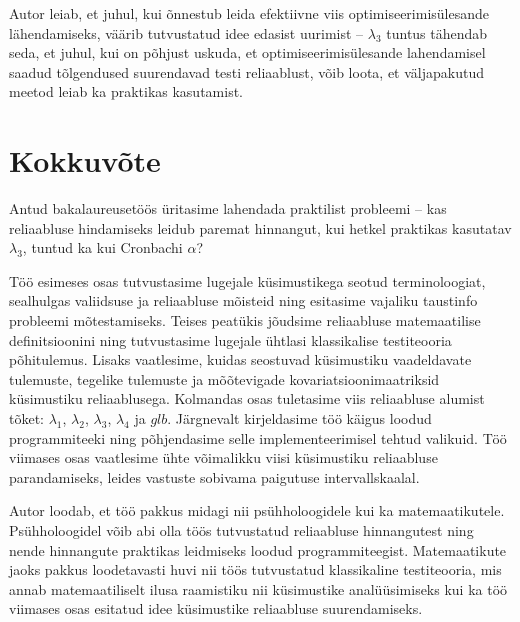 \documentclass[a4paper,12pt,oneside]{article}
\numberwithin{equation}{section}
\theoremstyle{definition}
\begin{document}
Autor leiab, et juhul, kui õnnestub leida efektiivne viis optimiseerimisülesande lähendamiseks, väärib tutvustatud idee edasist uurimist -- $\lambda_3$ tuntus tähendab seda, et juhul, kui on põhjust uskuda, et  optimiseerimisülesande lahendamisel saadud tõlgendused suurendavad testi reliaablust, võib loota, et väljapakutud meetod leiab ka praktikas kasutamist.

\pagebreak


\section*{Kokkuvõte}


Antud bakalaureusetöös üritasime lahendada praktilist probleemi -- kas reliaabluse hindamiseks leidub paremat hinnangut, kui hetkel praktikas kasutatav $\lambda_3$, tuntud ka kui Cronbachi $\alpha$?

Töö esimeses osas tutvustasime lugejale küsimustikega seotud terminoloogiat, sealhulgas valiidsuse ja reliaabluse mõisteid ning esitasime vajaliku taustinfo probleemi mõtestamiseks. Teises peatükis jõudsime reliaabluse matemaatilise definitsioonini ning tutvustasime lugejale ühtlasi klassikalise testiteooria põhitulemus. Lisaks vaatlesime, kuidas seostuvad küsimustiku vaadeldavate tulemuste, tegelike tulemuste ja mõõtevigade kovariatsioonimaatriksid küsimustiku reliaablusega. Kolmandas osas tuletasime viis reliaabluse alumist tõket: $\lambda_1$, $\lambda_2$, $\lambda_3$, $\lambda_4$ ja $glb$. Järgnevalt kirjeldasime töö käigus loodud programmiteeki ning põhjendasime selle implementeerimisel tehtud valikuid. Töö viimases osas vaatlesime ühte võimalikku viisi küsimustiku reliaabluse parandamiseks, leides vastuste sobivama paigutuse intervallskaalal. 


Autor loodab, et töö pakkus midagi nii psühholoogidele kui ka matemaatikutele. Psühholoogidel võib abi olla töös tutvustatud reliaabluse hinnangutest ning nende hinnangute praktikas leidmiseks loodud programmiteegist. Matemaatikute jaoks pakkus loodetavasti huvi nii töös tutvustatud  klassikaline testiteooria, mis annab matemaatiliselt ilusa raamistiku nii küsimustike analüüsimiseks kui ka töö viimases osas esitatud idee küsimustike reliaabluse suurendamiseks.    
   



\pagebreak
\end{document}
